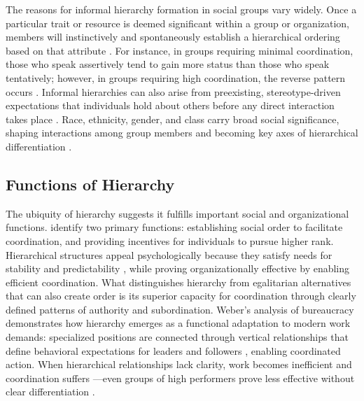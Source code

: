 The reasons for informal hierarchy formation in social groups vary widely. Once a particular trait or resource is deemed significant within a group or organization, members will instinctively and spontaneously establish a hierarchical ordering based on that attribute \citep{Magee-2008-SocialHierarchy}. For instance, in groups requiring minimal coordination, those who speak assertively tend to gain more status than those who speak tentatively; however, in groups requiring high coordination, the reverse pattern occurs \citep{Fragale-2006-Power}. Informal hierarchies can also arise from preexisting, stereotype-driven expectations that individuals hold about others before any direct interaction takes place \citep{Berger-1977-Status}. Race, ethnicity, gender, and class carry broad social significance, shaping interactions among group members and becoming key axes of hierarchical differentiation \citep{Berger-1977-Status, Ridgeway-1991-Social, Ridgeway-1998-HowDoStatusBeliefs}.

\subsection{Functions of Hierarchy}

The ubiquity of hierarchy suggests it fulfills important social and organizational functions. \citet{Magee-2008-SocialHierarchy} identify two primary functions: establishing social order to facilitate coordination, and providing incentives for individuals to pursue higher rank. Hierarchical structures appeal psychologically because they satisfy needs for stability and predictability \citep{Frenkel-1949-Intolerance, Sorrentino-1986-Uncertainty}, while proving organizationally effective by enabling efficient coordination. What distinguishes hierarchy from egalitarian alternatives that can also create order \citep{Krackhardt-1999-WhetherCloseOrFar} is its superior capacity for coordination through clearly defined patterns of authority and subordination. Weber's \citeyearpar{Weber-1946-Essays} analysis of bureaucracy demonstrates how hierarchy emerges as a functional adaptation to modern work demands: specialized positions are connected through vertical relationships that define behavioral expectations for leaders and followers \citep{Biggart-1984-Power, Dornbusch-1975-Authority}, enabling coordinated action. When hierarchical relationships lack clarity, work becomes inefficient and coordination suffers \citep{Greer-2007-HighPowerTeams, Overbeck-2005Internal}—even groups of high performers prove less effective without clear differentiation \citep{Groysberg-2011-TooManyCooks}.

